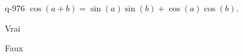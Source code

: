 \begin{truefalse}{q-976}
$\cos(a+b)=\sin(a)\sin(b)+\cos(a)\cos(b)$.
\item Vrai
\item* Faux
\end{truefalse}

